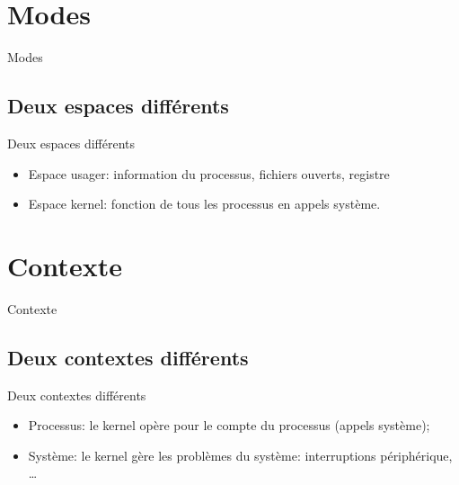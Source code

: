 \def\sectitle{Modes}
\section{\sectitle}

\begin{frame}{\sectitle}
\def\subsectitle{Deux espaces différents}
\subsection{\subsectitle}

\begin{block}{\subsectitle}
\begin{itemize}
    \item Espace usager: information du processus, fichiers ouverts, registre
    \item Espace kernel: fonction de tous les processus en appels système.
\end{itemize}
\end{block}

\end{frame}

\def\sectitle{Contexte}
\section{\sectitle}

\begin{frame}{\sectitle}

\def\subsectitle{Deux contextes différents}
\subsection{\subsectitle}

\begin{block}{\subsectitle}
\begin{itemize}
    \item Processus: le kernel opère pour le compte du processus (appels
    système);
    \item Système: le kernel gère les problèmes du système: interruptions
    périphérique, \dots
\end{itemize}
\end{block}
\end{frame}

